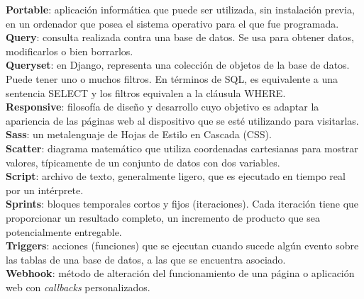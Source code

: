 \textbf{Portable}: aplicación informática que puede ser utilizada, sin instalación previa, en un ordenador que posea el sistema operativo para el que fue programada.\\

\textbf{Query}: consulta realizada contra una base de datos. Se usa para obtener datos, modificarlos o bien borrarlos.\\

\textbf{Queryset}: en Django, representa una colección de objetos de la base de datos. Puede tener uno o muchos filtros. En términos de SQL, es equivalente a una sentencia SELECT y los filtros equivalen a la cláusula WHERE.\\

\textbf{Responsive}: filosofía de diseño y desarrollo cuyo objetivo es adaptar la apariencia de las páginas web al dispositivo que se esté utilizando para visitarlas.\\

\textbf{Sass}: un metalenguaje de Hojas de Estilo en Cascada (CSS).\\

\textbf{Scatter}: diagrama matemático que utiliza coordenadas cartesianas para mostrar valores, típicamente de un conjunto de datos con dos variables.\\

\textbf{Script}: archivo de texto, generalmente ligero, que es ejecutado en tiempo real por un intérprete.\\

\textbf{Sprints}:  bloques temporales cortos y fijos (iteraciones). Cada iteración tiene que proporcionar un resultado completo, un incremento de producto que sea potencialmente entregable.\\

\textbf{Triggers}: acciones (funciones) que se ejecutan cuando sucede algún evento sobre las tablas de una base de datos, a las que se encuentra asociado.\\

\textbf{Webhook}: método de alteración del funcionamiento de una página o aplicación web con \textit{callbacks} personalizados.

\clearpage
